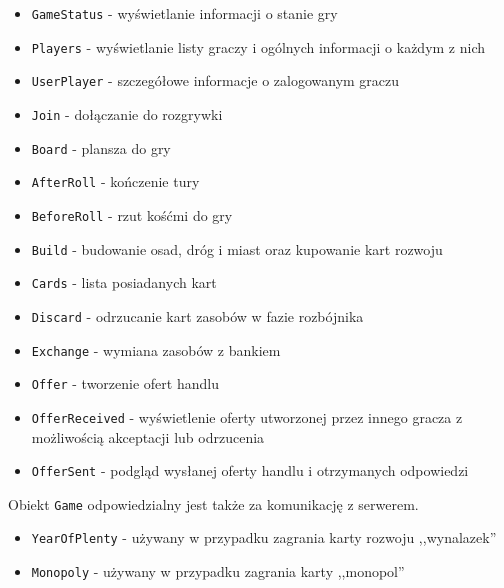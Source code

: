 \documentclass[a4paper,12pt]{article}
\begin{document}
\begin{itemize}
\item \texttt{GameStatus} - wyświetlanie informacji o stanie gry
\item \texttt{Players} - wyświetlanie listy graczy i ogólnych
  informacji o każdym z nich
\item \texttt{UserPlayer} - szczegółowe informacje o zalogowanym graczu
\item \texttt{Join} - dołączanie do rozgrywki
\item \texttt{Board} - plansza do gry
\item \texttt{AfterRoll} - kończenie tury
\item \texttt{BeforeRoll} - rzut kośćmi do gry
\item \texttt{Build} - budowanie osad, dróg i miast oraz kupowanie
  kart rozwoju
\item \texttt{Cards} - lista posiadanych kart
\item \texttt{Discard} - odrzucanie kart zasobów w fazie rozbójnika
\item \texttt{Exchange} - wymiana zasobów z bankiem
\item \texttt{Offer} - tworzenie ofert handlu
\item \texttt{OfferReceived} - wyświetlenie oferty utworzonej przez
  innego gracza z możliwością akceptacji lub odrzucenia
\item \texttt{OfferSent} - podgląd wysłanej oferty handlu i
  otrzymanych odpowiedzi
\end{itemize}

Obiekt \texttt{Game} odpowiedzialny jest także za komunikację z
serwerem.

\begin{itemize}
\item \texttt{YearOfPlenty} - używany w przypadku zagrania karty
  rozwoju ,,wynalazek''
\item \texttt{Monopoly} - używany w przypadku zagrania karty
  ,,monopol''
\end{itemize}

\end{document}
